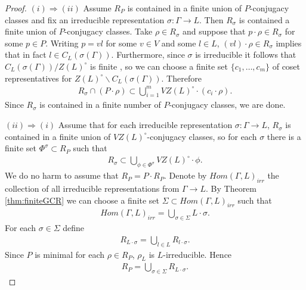 \begin{proof}\quad

  $(i) \Rightarrow (ii)$ Assume $R_P$ is contained in a finite union of $P$-conjugacy classes and fix an irreducible representation $\sigma : \Gamma \rightarrow L$. Then $R_{\sigma}$ is contained a finite union of $P$-conjugacy classes. Take $\rho \in R_{\sigma}$ and suppose that $p \cdot \rho \in R_{\sigma}$ for some $p \in P$. Writing $p = vl$ for some $v \in V$ and some $l \in L$, $(vl) \cdot \rho \in R_{\sigma}$ implies that in fact $l \in C_L(\sigma(\Gamma))$. Furthermore, since $\sigma$ is irreducible it follows that $C_L(\sigma(\Gamma))/Z(L)^\circ$ is finite \cite[Lemma 6.2]{martin2003reductive}, so we can choose a finite set $\{c_1, \ldots, c_m\}$ of coset representatives for $Z(L)^\circ\backslash C_L(\sigma(\Gamma))$. Therefore
  \begin{eqnarray*}
    R_{\sigma} \cap (P \cdot \rho) \subset \bigcup_{i = 1}^{m} VZ(L)^\circ \cdot \left( c_i \cdot \rho \right).
  \end{eqnarray*}
  Since $R_{\sigma}$ is contained in a finite number of $P$-conjugacy classes, we are done.

  $(ii) \Rightarrow (i)$ Assume that for each irreducible representation $\sigma : \Gamma \rightarrow L$, $R_{\sigma}$ is contained in a finite union of $VZ(L)^\circ$-conjugacy classes, so for each $\sigma$ there is a finite set $\Phi^\sigma \subset R_P$ such that
  \begin{eqnarray*}
    R_\sigma \subset \bigcup_{\phi \in \Phi^\sigma} VZ(L)^\circ \cdot \phi.
  \end{eqnarray*}
  We do no harm to assume that $R_P = P \cdot R_P$. Denote by $Hom(\Gamma, L)_{irr}$ the collection of all irreducible representations from $\Gamma \rightarrow L$. By Theorem \ref{thm:finiteGCR} we can choose a finite set $\Sigma \subset Hom(\Gamma, L)_{irr}$ such that
  \begin{eqnarray*}
    Hom(\Gamma, L)_{irr} = \bigcup_{\sigma \in \Sigma} L \cdot \sigma.
  \end{eqnarray*}
  For each $\sigma \in \Sigma$ define 
  \begin{eqnarray*}
    R_{L \cdot \sigma} = \bigcup_{l \in L} R_{l \cdot \sigma}.
  \end{eqnarray*}
  Since $P$ is minimal for each $\rho \in R_P$, $\rho_L$ is $L$-irreducible. Hence
  \begin{eqnarray*}
    R_P = \bigcup_{\sigma \in \Sigma} R_{L \cdot \sigma}.
  \end{eqnarray*}


\end{proof}
